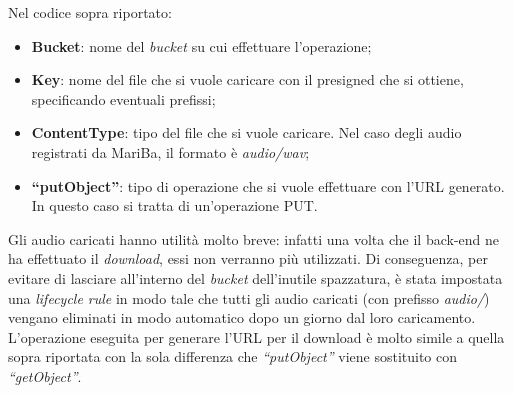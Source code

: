 		Nel codice sopra riportato:
		\begin{itemize}
			\item \textbf{Bucket}: nome del \emph{bucket} su cui effettuare l'operazione;
			\item \textbf{Key}: nome del file che si vuole caricare con il presigned che si ottiene, specificando eventuali prefissi;
			\item \textbf{ContentType}: tipo del file che si vuole caricare. Nel caso degli audio registrati da MariBa, il formato è \emph{audio/wav};
			\item \textbf{``putObject''}: tipo di operazione che si vuole effettuare con l'URL generato. In questo caso si tratta di un'operazione PUT.
		\end{itemize}
		
		Gli audio caricati hanno utilità molto breve: infatti una volta che il back-end ne ha effettuato il \emph{download}, 
		essi non verranno più utilizzati. Di conseguenza, per evitare di lasciare all'interno del \emph{bucket} dell'inutile spazzatura, è stata impostata una \emph{lifecycle rule} in modo tale che tutti gli audio caricati (con prefisso \emph{audio/}) vengano eliminati in modo automatico dopo un giorno dal loro caricamento. \\
		
		\noindent  L'operazione eseguita per generare l'URL per il download è molto simile a quella sopra riportata con la sola differenza che \emph{``putObject''} viene sostituito con \emph{``getObject''}.
	
